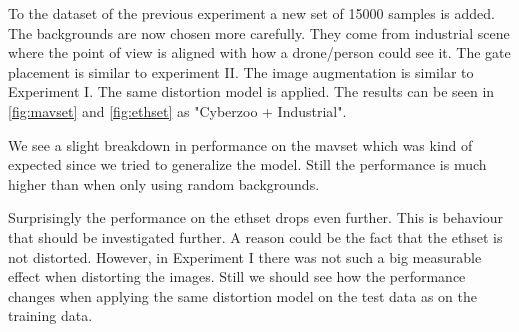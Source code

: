 \documentclass{article}
\begin{document}
To the dataset of the previous experiment a new set of 15000 samples is added. The backgrounds are now chosen more carefully. They come from industrial scene where the point of view is aligned with how a drone/person could see it. The gate placement is similar to experiment II. The image augmentation is similar to Experiment I. The same distortion model is applied. The results can be seen in \autoref{fig:mavset} and \autoref{fig:ethset} as "Cyberzoo + Industrial".

We see a slight breakdown in performance on the mavset which was kind of expected since we tried to generalize the model. Still the performance is much higher than when only using random backgrounds. 

Surprisingly the performance on the ethset drops even further. This is behaviour that should be investigated further. A reason could be the fact that the ethset is not distorted. However, in Experiment I there was not such a big measurable effect when distorting the images. Still we should see how the performance changes when applying the same distortion model on the test data as on the training data.
\end{document}
